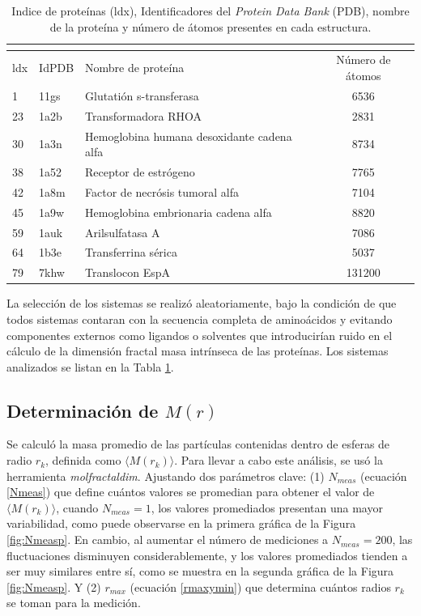  	\begin{table}[H]
 		\centering
 		\begin{tabular}{||lllc||}
 			\multicolumn{4}{l}{} \\ 
 			\hline
 			ldx & IdPDB & Nombre de prote\'{i}na & N\'{u}mero de \'{a}tomos \\
 			\hline
 			 1 & 11gs & Glutati\'{o}n s-transferasa & 6536 \\ 
 			23 & 1a2b & Transformadora RHOA & 2831 \\
 			30 & 1a3n & Hemoglobina humana desoxidante cadena alfa & 8734 \\
			38 & 1a52 & Receptor de estr\'{o}geno & 7765 \\
 			42 & 1a8m & Factor de necr\'{o}sis tumoral alfa & 7104 \\
 			45 & 1a9w & Hemoglobina embrionaria cadena alfa & 8820 \\
			59 & 1auk & Arilsulfatasa A & 7086 \\
			64 & 1b3e & Transferrina s\'{e}rica & 5037 \\
			79 & 7khw & Translocon EspA & 131200 \\
 			\hline
 		\end{tabular}
 		\caption{Indice de proteínas (ldx), Identificadores del \emph{Protein Data Bank} (PDB), nombre de la prote\'{i}na y n\'{u}mero de \'{a}tomos presentes en cada estructura.}
 		\label{Tabla:ids9}
 	\end{table}
 	
 	
 	
 	La selecci\'{o}n de los sistemas se realiz\'{o} aleatoriamente, bajo la condici\'{o}n de que todos sistemas contaran con la secuencia completa de amino\'{a}cidos y evitando componentes externos como ligandos o solventes que introducir\'{i}an ruido en el c\'{a}lculo de la dimensi\'{o}n fractal masa intr\'{i}nseca de las prote\'{i}nas. Los sistemas analizados se listan en la Tabla \ref{Tabla:ids9}.
 

	
	\subsection{Determinaci\'{o}n de $M(r)$}
	\label{sec:detM(r)}
	
	Se calcul\'{o} la masa promedio de las part\'{i}culas 
	contenidas dentro de esferas de radio $r_k$, definida 
	como $\langle M(r_{k}) \rangle$. 
	Para llevar a cabo este an\'{a}lisis, se us\'{o} la 
	herramienta \textit{molfractaldim}. Ajustando dos par\'{a}metros
	clave: (1) $N_{meas}$ (ecuación \ref{Nmeas}) que define cu\'{a}ntos 
	valores se promedian para obtener el valor de $\langle M(r_{k}) \rangle$,
	cuando $N_{meas} = 1$, los valores promediados presentan una mayor 
	variabilidad, como puede observarse en la primera gráfica de la 
	Figura \ref{fig:Nmeasp}. En cambio, al aumentar el número de mediciones 
	a $N_{meas} = 200$, las fluctuaciones disminuyen considerablemente,
	 y los valores promediados tienden a ser muy similares entre sí, como se 
	 muestra en la segunda gráfica de la Figura \ref{fig:Nmeasp}.
	 Y (2) $r_{max}$ (ecuación \ref{rmaxymin}) que determina 
	cu\'{a}ntos radios $r_{k}$ se toman para la medici\'{o}n.
	

